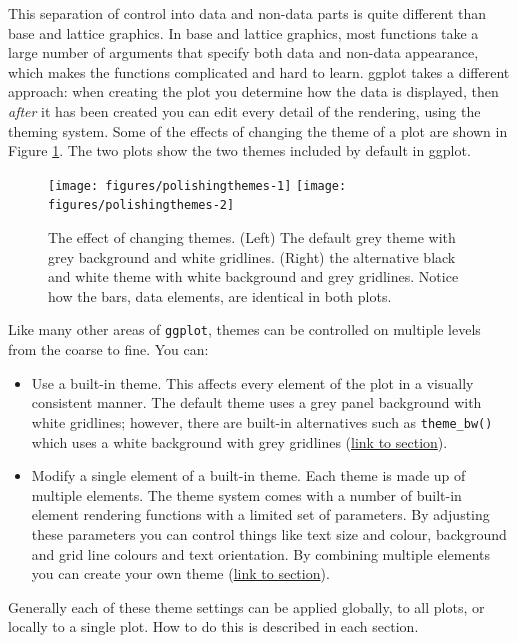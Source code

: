 This separation of control into data and non-data parts is quite
different than base and lattice graphics. In base and lattice graphics,
most functions take a large number of arguments that specify both data
and non-data appearance, which makes the functions complicated and hard
to learn. ggplot takes a different approach: when creating the plot you
determine how the data is displayed, then \emph{after} it has been
created you can edit every detail of the rendering, using the theming
system. Some of the effects of changing the theme of a plot are shown in
Figure \ref{fig:themes}. The two plots show the two themes included by
default in ggplot.

\begin{figure}

{\centering \texttt{[image: figures/polishingthemes-1]} \texttt{[image: figures/polishingthemes-2]} 

}

\caption{The effect of changing themes.  (Left) The default grey theme with grey background and white gridlines.  (Right) the alternative black and white theme with white background and grey gridlines.  Notice how the bars, data elements, are identical in both plots.\label{fig:themes}}
\end{figure}

Like many other areas of \texttt{ggplot}, themes can be controlled on
multiple levels from the coarse to fine. You can:

\begin{itemize}
\itemsep1pt\parskip0pt
\item
  Use a built-in theme. This affects every element of the plot in a
  visually consistent manner. The default theme uses a grey panel
  background with white gridlines; however, there are built-in
  alternatives such as \texttt{theme\_bw()} which uses a white
  background with grey gridlines (\hyperref[sec:built-in]{link to
  section}).
\item
  Modify a single element of a built-in theme. Each theme is made up of
  multiple elements. The theme system comes with a number of built-in
  element rendering functions with a limited set of parameters. By
  adjusting these parameters you can control things like text size and
  colour, background and grid line colours and text orientation. By
  combining multiple elements you can create your own theme
  (\hyperref[sec:theme-elements]{link to section}).
\end{itemize}

Generally each of these theme settings can be applied globally, to all
plots, or locally to a single plot. How to do this is described in each
section.

